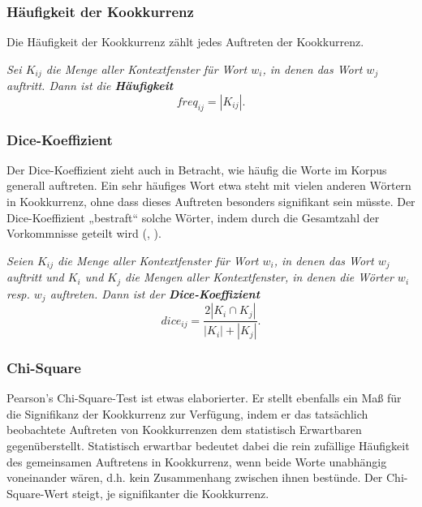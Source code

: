 \documentclass[11pt,numbers=noenddot]{scrartcl}
\begin{document}
\subsubsection{Häufigkeit der Kookkurrenz} \label{freq}

Die Häufigkeit der Kookkurrenz zählt jedes Auftreten der Kookkurrenz.

\emph{Sei $K_{ij}$ die Menge aller Kontextfenster für Wort $w_i$, in denen das Wort $w_j$ auftritt. Dann ist die \textbf{Häufigkeit}}
\begin{equation*}
   freq_{ij} = |K_{ij}|.
\end{equation*}

\subsubsection{Dice-Koeffizient} \label{dice}

Der Dice-Koeffizient zieht auch in Betracht, wie häufig die Worte im Korpus generall auftreten. Ein sehr häufiges Wort etwa steht mit vielen anderen Wörtern in Kookkurrenz, ohne dass dieses Auftreten besonders signifikant sein müsste. Der Dice-Koeffizient „bestraft“ solche Wörter, indem durch die Gesamtzahl der Vorkommnisse geteilt wird (\citet[S.299]{manning1999}, \citet[S. 213]{heyer2008}).

\emph{Seien $K_{ij}$ die Menge aller Kontextfenster für Wort $w_i$, in denen das Wort $w_j$ auftritt und $K_{i}$ und $K_{j}$ die Mengen aller Kontextfenster, in denen die Wörter $w_i$ resp. $w_j$ auftreten. Dann ist der \textbf{Dice-Koeffizient}}
\begin{equation*}
   dice_{ij} = \frac{2 |K_{i} \cap K_{j}| }{|K_{i}| + |K_{j}|}.
\end{equation*}

\subsubsection{Chi-Square} \label{chi}

Pearson's Chi-Square-Test ist etwas elaborierter. Er stellt ebenfalls ein Maß für die Signifikanz der Kookkurrenz zur Verfügung, indem er das tatsächlich beobachtete Auftreten von Kookkurrenzen dem statistisch Erwartbaren gegenüberstellt. Statistisch erwartbar bedeutet dabei die rein zufällige Häufigkeit des gemeinsamen Auftretens in Kookkurrenz, wenn beide Worte unabhängig voneinander wären, d.h. kein Zusammenhang zwischen ihnen bestünde. Der Chi-Square-Wert steigt, je signifikanter die Kookkurrenz.
\end{document}
